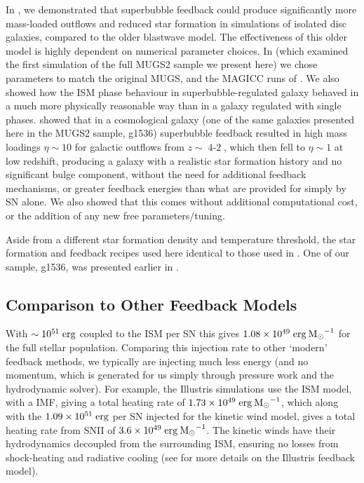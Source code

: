 In \citet{Keller2014}, we demonstrated that superbubble feedback could produce
significantly more mass-loaded outflows and reduced star formation in
simulations of isolated disc galaxies, compared to the older \citep{Stinson2006}
blastwave model.  The effectiveness of this older model is highly dependent on
numerical parameter choices.  In \citet{Keller2015} (which examined the first
simulation of the full MUGS2 sample we present here) we chose parameters to
match the original MUGS, and the MAGICC runs of \citet{Stinson2013}. We also
showed how the ISM phase behaviour in superbubble-regulated galaxy behaved in a
much more physically reasonable way than in a galaxy regulated with single
phases.  \citet{Keller2015} showed that in a cosmological galaxy (one of the
same galaxies presented here in the MUGS2 sample, g1536) superbubble feedback
resulted in high mass loadings $\eta\sim10 $ for galactic outflows from
$z\sim\operatorname{4-2}$, which then fell to $\eta\sim1$ at low redshift, producing a galaxy
with a realistic star formation history and no significant bulge component,
without the need for additional feedback mechanisms, or greater feedback
energies than what are provided for simply by SN alone.  We also showed that
this comes without additional computational cost, or the addition of any new
free parameters/tuning.

Aside from a different star formation density and temperature threshold, the
star formation and feedback recipes used here identical to those used in
\citet{Keller2014}.  One of our sample, g1536, was presented earlier in
\citet{Keller2015}.

\subsection{Comparison to Other Feedback Models}
With $\sim10^{51}\; \rm{erg}$ coupled to the ISM per SN this gives
$1.08\times10^{49}\; \rm{erg}\>{\rm M_{\odot}}^{-1}$ for the full stellar population.
Comparing this injection rate to other `modern' feedback methods, we typically
are injecting much less energy (and no momentum, which is generated for us
simply through pressure work and the hydrodynamic solver).  For example, the
Illustris simulations \citep{Vogelsberger2014b} use the \citet{Springel2003} ISM
model, with a \citet{Chabrier2003} IMF, giving a total heating rate of
$1.73\times10^{49}\; \rm{erg}\>{\rm M_{\odot}}^{-1}$, which along with the
$1.09\times10^{51}\;\rm{erg}$ per SN injected for the kinetic wind model, gives
a total heating rate from SNII of $3.6\times10^{49}\;\rm{erg}\>{\rm M_{\odot}}^{-1}$.  The
kinetic winds have their hydrodynamics decoupled from the surrounding ISM,
ensuring no losses from shock-heating and radiative cooling (see
\citealt{Vogelsberger2013,Vogelsberger2014a} for more details on the Illustris
feedback model).  

